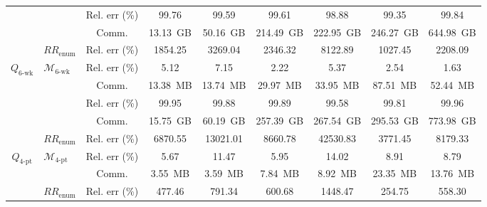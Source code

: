 \begin{table}[hbtp!]
\begin{threeparttable}
{\begin{tabular}{clccccccc}
& {\multirow[c]{2}{*}{$\mathrm{WalkClip}_5$}}
& {Rel. err (\%)} 
& {99.76} 
& {99.59} 
& {99.61} 
& {98.88} 
& {99.35} 
& {99.84} \\
& & {Comm.} & {13.13~GB} & {50.16~GB} & {214.49~GB} & {222.95~GB} & {246.27~GB} & {644.98~GB} \\
\cmidrule(lr){2-9}


& \multirow[c]{1}{*}{$RR_{\text{enum}}$}
& Rel. err (\%) & 1854.25 & 3269.04 & 2346.32 & 8122.89 & 1027.45 & 2208.09 \\
\midrule

\multirow[c]{5}{*}[-4pt]{
{$Q_{\mathrm{6\text{-}wk}}$}}
& \multirow[c]{2}{*}{{$\mathcal{M}_{\mathrm{6\text{-}wk}}$}}
& {Rel. err (\%)} 
& \cellcolor{gray!35} {5.12} 
& \cellcolor{gray!35} {7.15} 
& \cellcolor{gray!35} {2.22} 
& \cellcolor{gray!35} {5.37} 
& \cellcolor{gray!35} {2.54} 
& \cellcolor{gray!35} {1.63} \\
& & {Comm.} 
& \cellcolor{gray!12} {13.38~MB} 
& \cellcolor{gray!12} {13.74~MB} 
& \cellcolor{gray!12} {29.97~MB} 
& \cellcolor{gray!12} {33.95~MB} 
& \cellcolor{gray!12} {87.51~MB} 
& \cellcolor{gray!12} {52.44~MB} \\
\cmidrule(lr){2-9}

& {\multirow[c]{2}{*}{$\mathrm{WalkClip}_6$}}
& {Rel. err (\%)} 
& {99.95} 
& {99.88} 
& {99.89} 
& {99.58} 
& {99.81} 
& {99.96} \\
& & {Comm.} & {15.75~GB} & {60.19~GB} & {257.39~GB} & {267.54~GB} & {295.53~GB} & {773.98~GB} \\


\cmidrule(lr){2-9}
& \multirow[c]{1}{*}{{$RR_{\text{enum}}$}}
& {Rel. err (\%)} 
& {6870.55} & {13021.01} & {8660.78} & {42530.83} & {3771.45} & {8179.33} \\
\midrule


\multirow[c]{3}{*}{$Q_{\mathrm{4\text{-}pt}}$}
& \multirow[c]{2}{*}{${\mathcal{M}}_{\mathrm{4\text{-}pt}}$}
& Rel. err (\%) & \cellcolor{gray!35}5.67
& \cellcolor{gray!35}11.47 
& \cellcolor{gray!35}5.95 
& \cellcolor{gray!35}14.02 
& \cellcolor{gray!35}8.91 
& \cellcolor{gray!35}8.79 \\
& & Comm. & \cellcolor{gray!12}3.55~MB 
& \cellcolor{gray!12}3.59~MB 
& \cellcolor{gray!12}7.84~MB
& \cellcolor{gray!12}8.92~MB 
& \cellcolor{gray!12}23.35~MB 
& \cellcolor{gray!12}13.76~MB \\
\cmidrule(lr){2-9}
& \multirow[c]{1}{*}{$RR_{\text{enum}}$}
& Rel. err (\%) & 477.46 & 791.34 & 600.68 & 1448.47 & 254.75 & 558.30 \\
\midrule


\end{tabular}}
\end{threeparttable}
\end{table}
